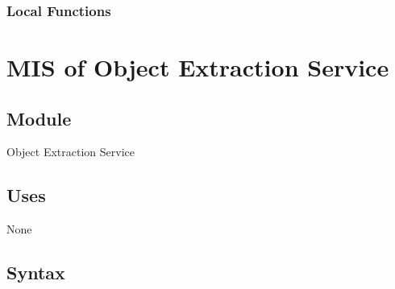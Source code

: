 \documentclass[12pt, titlepage]{article}
\begin{document}
  
  
  
  \subsubsection{Local Functions}

   
  

\newpage



\section{MIS of Object Extraction Service }\label{object extraction service}
  
  
  
  \subsection{Module}
  
  Object Extraction Service
  
  \subsection{Uses}
  
  None

  \subsection{Syntax}
\end{document}

